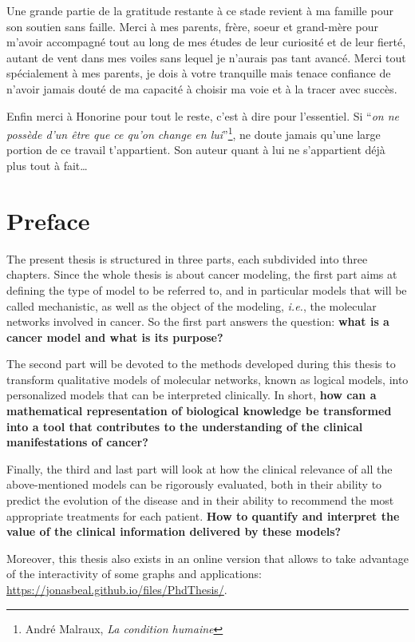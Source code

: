 \documentclass[a4paper,12pt,twoside,onecolumn,openright,final,oldfontcommands]{memoir}
\newcommand{\initial}[1]{
	\lettrine[lines=3,lhang=0.33,nindent=0em]{
		\color{gray}
     		{\textsc{#1}}}{}}
\newcommand{\clearemptydoublepage}{\newpage{\thispagestyle{empty}\cleardoublepage}}
\begin{document}
Une grande partie de la gratitude restante à ce stade revient à ma
famille pour son soutien sans faille. Merci à mes parents, frère, soeur
et grand-mère pour m'avoir accompagné tout au long de mes études de leur
curiosité et de leur fierté, autant de vent dans mes voiles sans lequel
je n'aurais pas tant avancé. Merci tout spécialement à mes parents, je
dois à votre tranquille mais tenace confiance de n'avoir jamais douté de
ma capacité à choisir ma voie et à la tracer avec succès.

Enfin merci à Honorine pour tout le reste, c'est à dire pour
l'essentiel. Si ``\emph{on ne possède d'un être que ce qu'on change en
lui}''\footnote{André Malraux, \emph{La condition humaine}}, ne doute
jamais qu'une large portion de ce travail t'appartient. Son auteur quant
à lui ne s'appartient déjà plus tout à fait\ldots{}

\clearemptydoublepage

\chapter*{Preface}

\initial{T}he present thesis is structured in three parts, each
subdivided into three chapters. Since the whole thesis is about cancer
modeling, the first part aims at defining the type of model to be
referred to, and in particular models that will be called mechanistic,
as well as the object of the modeling, \emph{i.e.}, the molecular
networks involved in cancer. So the first part answers the question:
\textbf{what is a cancer model and what is its purpose?}

The second part will be devoted to the methods developed during this
thesis to transform qualitative models of molecular networks, known as
logical models, into personalized models that can be interpreted
clinically. In short, \textbf{how can a mathematical representation of
biological knowledge be transformed into a tool that contributes to the
understanding of the clinical manifestations of cancer?}

Finally, the third and last part will look at how the clinical relevance
of all the above-mentioned models can be rigorously evaluated, both in
their ability to predict the evolution of the disease and in their
ability to recommend the most appropriate treatments for each patient.
\textbf{How to quantify and interpret the value of the clinical
information delivered by these models?}

Moreover, this thesis also exists in an online version that allows to
take advantage of the interactivity of some graphs and applications:
\url{https://jonasbeal.github.io/files/PhdThesis/}.
\end{document}
